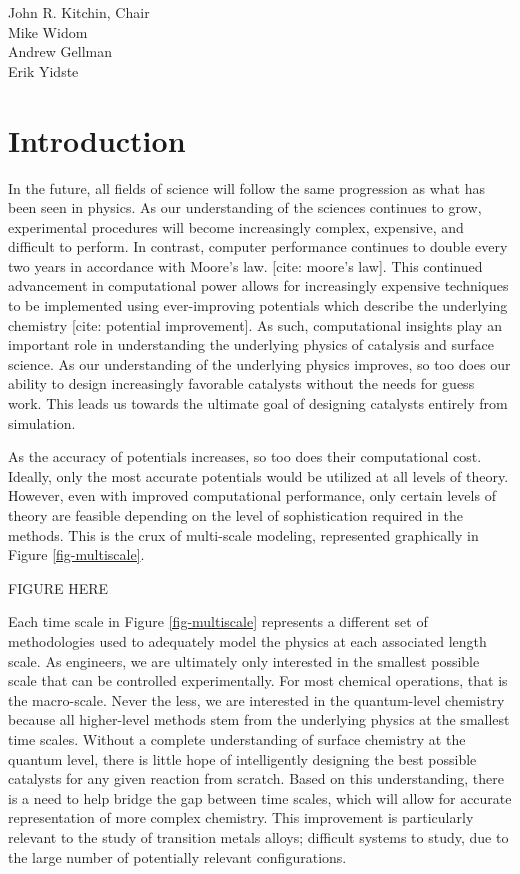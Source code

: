\documentclass[12pt]{cmuthesis}
\begin{document}
\begin{acknowledgments}
John R. Kitchin, Chair \\
Mike Widom \\
Andrew Gellman \\
Erik Yidste
\end{acknowledgments}

\tableofcontents
\listoftables
\listoffigures

\mainmatter
\renewcommand{\baselinestretch}{1.66}\normalsize

\chapter{Introduction}
\label{sec:ch0}
In the future, all fields of science will follow the same progression as what has been seen in physics. As our understanding of the sciences continues to grow, experimental procedures will become increasingly complex, expensive, and difficult to perform. In contrast, computer performance continues to double every two years in accordance with Moore's law. [cite: moore's law]. This continued advancement in computational power allows for increasingly expensive techniques to be implemented using ever-improving potentials which describe the underlying chemistry [cite: potential improvement]. As such, computational insights play an important role in understanding the underlying physics of catalysis and surface science. As our understanding of the underlying physics improves, so too does our ability to design increasingly favorable catalysts without the needs for guess work. This leads us towards the ultimate goal of designing catalysts entirely from simulation.

As the accuracy of potentials increases, so too does their computational cost. Ideally, only the most accurate potentials would be utilized at all levels of theory. However, even with improved computational performance, only certain levels of theory are feasible depending on the level of sophistication required in the methods. This is the crux of multi-scale modeling, represented graphically in Figure \ref{fig-multiscale}.

FIGURE HERE

Each time scale in Figure \ref{fig-multiscale} represents a different set of methodologies used to adequately model the physics at each associated length scale. As engineers, we are ultimately only interested in the smallest possible scale that can be controlled experimentally. For most chemical operations, that is the macro-scale. Never the less, we are interested in the quantum-level chemistry because all higher-level methods stem from the underlying physics at the smallest time scales. Without a complete understanding of surface chemistry at the quantum level, there is little hope of intelligently designing the best possible catalysts for any given reaction from scratch. Based on this understanding, there is a need to help bridge the gap between time scales, which will allow for accurate representation of more complex chemistry. This improvement is particularly relevant to the study of transition metals alloys; difficult systems to study, due to the large number of potentially relevant configurations.
\end{document}
